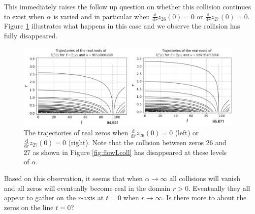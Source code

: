 \documentclass[a4paper,11pt,twoside]{amsart}
\begin{document}
This immediately raises the follow up question on whether this collision continues to exist when $\alpha$ is varied and in particular when $\frac{\mathrm{d}}{\mathrm{d} r} z_{26}(0) = 0$ or $\frac{\mathrm{d}}{\mathrm{d} r} z_{27}(0) = 0$. Figure \ref{fig:flowLcollsplit} illustrates what happens in this case and we observe the collision has fully disappeared. 

\begin{figure}[H]
  \includegraphics[width=0.9\linewidth]{LaguerreCollSplitdouble.jpg}
  \caption{The trajectories of real zeros when $\frac{\mathrm{d}}{\mathrm{d} r} z_{26}(0) = 0$ (left) or $\frac{\mathrm{d}}{\mathrm{d} r} z_{27}(0) = 0$ (right). Note that the collision between zeros $26$ and $27$ as shown in Figure \ref{fig:flowLcoll} has disappeared at these levels of $\alpha$.}
  \label{fig:flowLcollsplit}
\end{figure}

Based on this observation, it seems that when $\alpha \rightarrow \infty$ all collisions will vanish and all zeros will eventually become real in the domain $r > 0$. Eventually they all appear to gather on the $r$-axis at $t=0$ when $r \rightarrow \infty$. Is there more to about the zeros on the line $t=0$? 
\end{document}
